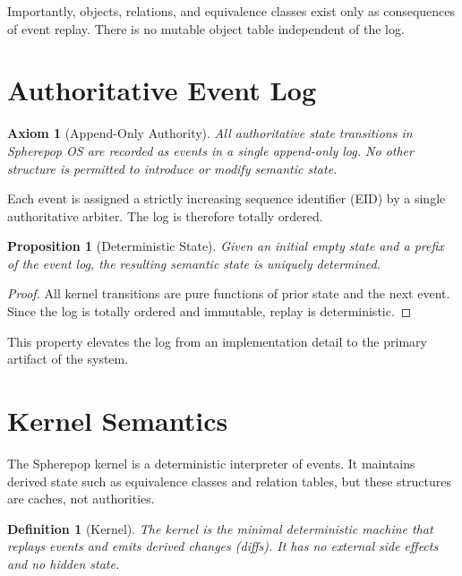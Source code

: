 \documentclass[11pt]{article}
\newtheorem{definition}{Definition}[section]
\newtheorem{axiom}{Axiom}[section]
\newtheorem{proposition}{Proposition}[section]
\begin{document}
Importantly, objects, relations, and equivalence classes exist only as consequences of event replay. There is no mutable object table independent of the log.

\section{Authoritative Event Log}

\begin{axiom}[Append-Only Authority]
\label{ax:append-only}
All authoritative state transitions in Spherepop OS are recorded as events in a single append-only log. No other structure is permitted to introduce or modify semantic state.
\end{axiom}

Each event is assigned a strictly increasing sequence identifier (EID) by a single authoritative arbiter. The log is therefore totally ordered.

\begin{proposition}[Deterministic State]
\label{prop:deterministic-state}
Given an initial empty state and a prefix of the event log, the resulting semantic state is uniquely determined.
\end{proposition}

\begin{proof}
All kernel transitions are pure functions of prior state and the next event. Since the log is totally ordered and immutable, replay is deterministic.
\end{proof}

This property elevates the log from an implementation detail to the primary artifact of the system.

\section{Kernel Semantics}

The Spherepop kernel is a deterministic interpreter of events. It maintains derived state such as equivalence classes and relation tables, but these structures are caches, not authorities.

\begin{definition}[Kernel]
The kernel is the minimal deterministic machine that replays events and emits derived changes (diffs). It has no external side effects and no hidden state.
\end{definition}
\end{document}
